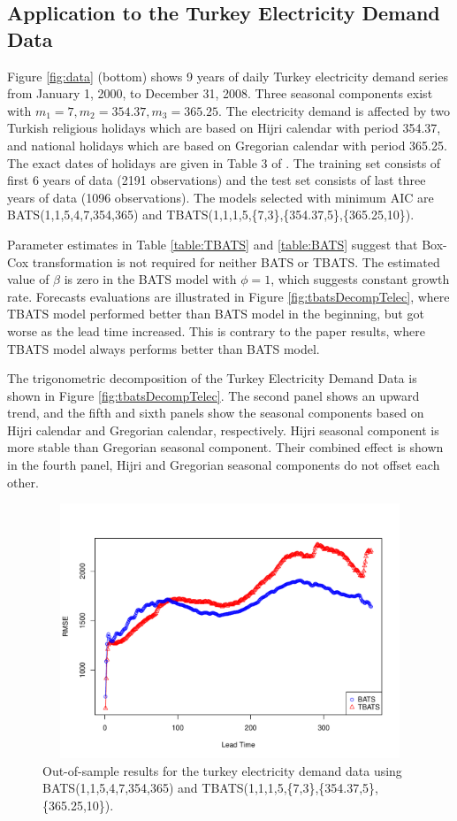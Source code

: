 \documentclass{uwstat572}
\begin{document}
\subsection{Application to the Turkey Electricity Demand Data}
\hspace{4ex}Figure \ref{fig:data} (bottom) shows 9 years of daily Turkey electricity demand series from January 1, 2000, to December 31, 2008. Three seasonal components exist with $m_1=7, m_2=354.37, m_3=365.25$. The electricity demand is affected by two Turkish religious holidays which are based on Hijri calendar with period 354.37, and national holidays which are based on Gregorian calendar with period 365.25. The exact dates of holidays are given in Table 3 of \citet{de2011forecasting}. The training set consists of first 6 years of data (2191 observations) and the test set consists of last three years of data (1096 observations). The models selected with minimum AIC are BATS(1,1,5,4,7,354,365) and TBATS(1,1,1,5,\{7,3\},\{354.37,5\},\{365.25,10\}).

Parameter estimates in Table \ref{table:TBATS} and \ref{table:BATS} suggest that Box-Cox transformation is not required for neither BATS or TBATS. The estimated value of $\beta$ is zero in the BATS model with $\phi=1$, which suggests constant growth rate. Forecasts evaluations are illustrated in Figure \ref{fig:tbatsDecompTelec}, where TBATS model performed better than BATS model in the beginning, but got worse as the lead time increased. This is contrary to the paper results, where TBATS model always performs better than BATS model.

The trigonometric decomposition of the Turkey Electricity Demand Data is shown in Figure \ref{fig:tbatsDecompTelec}. The second panel shows an upward trend, and the fifth and sixth panels show the seasonal components based on Hijri calendar and Gregorian calendar, respectively. Hijri seasonal component is more stable than Gregorian seasonal component. Their combined effect is shown in the fourth panel, Hijri and Gregorian seasonal components do not offset each other.

\begin{figure}[]
\centering
  \includegraphics[width=6in,height=3in]{telecRMSE.pdf}
  \caption{Out-of-sample results for the turkey electricity demand data using BATS(1,1,5,4,7,354,365) and TBATS(1,1,1,5,\{7,3\},\{354.37,5\},\{365.25,10\}).}
  \label{fig:telecRMSE}
\end{figure}
\end{document}
